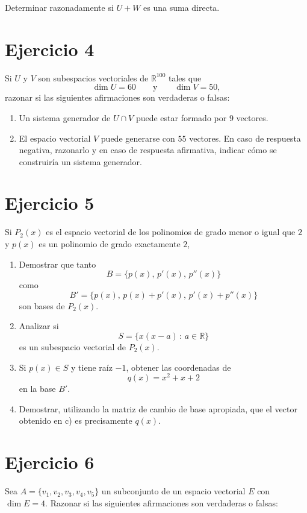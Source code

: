 \documentclass[12pt]{article}
\begin{document}
Determinar razonadamente si \(U+W\) es una suma directa.

\section*{Ejercicio 4}

Si \(U\) y \(V\) son subespacios vectoriales de \(\mathbb{R}^{100}\) tales que
\[
\dim U=60
\qquad\text{y}\qquad
\dim V=50,
\]
razonar si las siguientes afirmaciones son verdaderas o falsas:

\begin{enumerate}
    \item Un sistema generador de \(U\cap V\) puede estar formado por \(9\) vectores.
    \item El espacio vectorial \(V\) puede generarse con \(55\) vectores. En caso de respuesta negativa, razonarlo y en caso de respuesta afirmativa, indicar cómo se construiría un sistema generador.
\end{enumerate}

\section*{Ejercicio 5}

Si \(P_2(x)\) es el espacio vectorial de los polinomios de grado menor o igual que \(2\) y \(p(x)\) es un polinomio de grado exactamente \(2\),

\begin{enumerate}
    \item[a)] Demostrar que tanto
    \[
    B=\{p(x),\,p'(x),\,p''(x)\}
    \]
    como
    \[
    B'=\{p(x),\,p(x)+p'(x),\,p'(x)+p''(x)\}
    \]
    son bases de \(P_2(x)\).

    \item[b)] Analizar si
    \[
    S=\{x(x-a)\,:\,a\in\mathbb{R}\}
    \]
    es un subespacio vectorial de \(P_2(x)\).

    \item[c)] Si \(p(x)\in S\) y tiene raíz \(-1\), obtener las coordenadas de
    \[
    q(x)=x^2+x+2
    \]
    en la base \(B'\).

    \item[d)] Demostrar, utilizando la matriz de cambio de base apropiada, que el vector obtenido en c) es precisamente \(q(x)\).
\end{enumerate}

\section*{Ejercicio 6}
Sea \(A=\{v_1,v_2,v_3,v_4,v_5\}\) un subconjunto de un espacio vectorial \(E\) con \(\dim E=4\). Razonar si las siguientes afirmaciones son verdaderas o falsas:
    
\end{document}
